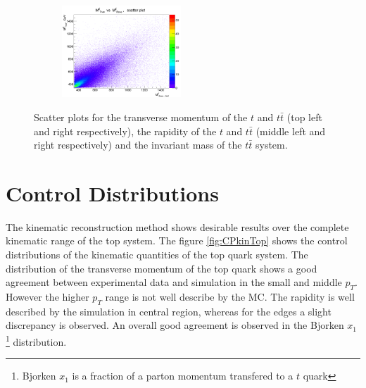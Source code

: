 \begin{figure}[t]
\begin{subfigure}
\end{subfigure}
\begin{subfigure}
  \centering
  \includegraphics[width=0.49\textwidth]{05_kinReco/plots/scatter/mtt-scaterPlot.png}
\end{subfigure}
\caption{Scatter plots for the transverse momentum of the $t$ and $t\bar{t}$ (top left and right respectively), the rapidity of the $t$ and $t\bar{t}$ (middle left and 
         right respectively) and the invariant mass of the $t\bar{t}$ system.}
\label{fig:ScatterPl}
\end{figure}

\section{Control Distributions}

The kinematic reconstruction method shows desirable results over the complete kinematic range of the top system. The figure \ref{fig:CPkinTop} shows
the control distributions of the kinematic quantities of the top quark system. The distribution of the transverse momentum of the top quark
shows a good agreement between experimental data and simulation in the small and middle $p_{T}$. However the higher $p_{T}$ range is not well
describe by the MC. The rapidity is well described by the simulation in central region, whereas for the edges a slight discrepancy is observed.
An overall good agreement is observed in the Bjorken $x_{1}$\footnote{Bjorken $x_{1}$ is a fraction of a parton momentum transfered to a $t$ quark} 
distribution.

